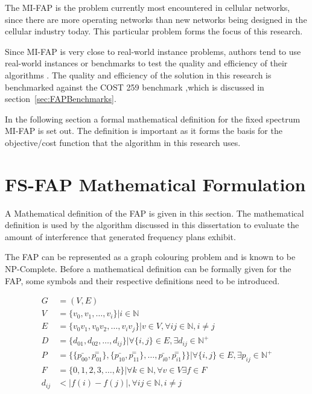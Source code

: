 The \gls{MI-FAP} is the problem currently most encountered in cellular networks, since there are more operating networks than new networks being designed in the cellular industry today. This particular problem forms the focus of this research. 

Since \gls{MI-FAP} is very close to real-world instance problems, authors tend to use real-world instances or benchmarks to test the quality and efficiency of their algorithms \cite{Eisenblatter,MontemanniThesis}. The quality and efficiency of the solution in this research is benchmarked against the \gls{COST} 259 benchmark ,which is discussed in section~\ref{sec:FAPBenchmarks}.

In the following section a formal mathematical definition for the fixed spectrum \gls{MI-FAP} is set out. The definition is important as it forms the basis for the objective/cost function that the algorithm in this research uses.
 
\section{\gls{FS-FAP} Mathematical Formulation}
\label{sec:FAPMathDef}
A Mathematical definition of the \gls{FAP} is given in this section. The mathematical definition is used by the algorithm discussed in this dissertation to evaluate the amount of interference that generated frequency plans exhibit.

The \gls{FAP} can be represented as a graph colouring problem and is known to be NP-Complete. Before a mathematical definition can be formally given for the \gls{FAP}, some symbols and their respective definitions need to be introduced.

\begin{align}
	G &= (V,E) \label{E:setG}\\
	V &= \{v_{0},v_{1},\ldots,v_{i}\} | i \in \mathbb{N} \label{E:setV}\\
	E &= \{v_0v_1,v_0v_2,\ldots,v_iv_j\}|v \in V,\forall ij \in \mathbb{N},i \neq j \label{E:setE}\\
	D &= \{d_{01},d_{02},\ldots,d_{ij}\}| \forall\{i,j\} \in E, \exists d_{ij} \in \mathbb{N}^+ \label{E:setD}\\
	P &= \{\{\bar{p_{00}},\overset{=}{p_{01}}\},\{\bar{p_{10}},\overset{=}{p_{11}}\},\ldots,\bar{p_{i0}},\overset{=}{p_{i1}}\}\}| \forall \{i,j\} \in E,\exists p_{ij} \in \mathbb{N}^+ \label{E:setP}\\
	F &= \{0,1,2,3,\ldots,k\}| \forall k \in \mathbb{N},\forall v \in V \exists f \in F\label{E:setF}\\
	d_{ij} &< |f(i) - f(j)|, \forall ij \in \mathbb{N},i \neq j \label{E:interference}
\end{align}

